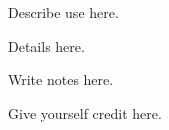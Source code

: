 \ModuleRefUse
Describe use here.

\ModuleRefDetails
Details here.

\ModuleRefNotes
Write notes here.

\ModuleRefCredits
Give yourself credit here.

